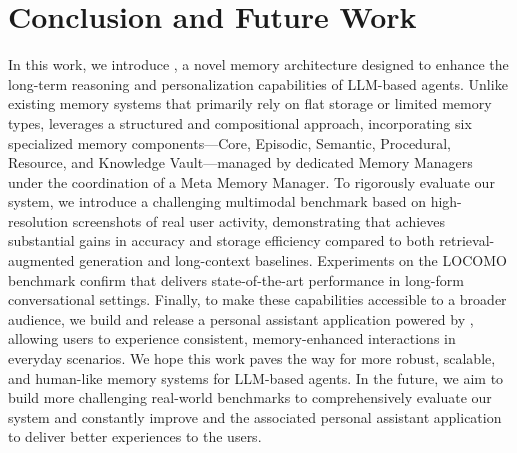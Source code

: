 \section{Conclusion and Future Work}
In this work, we introduce \ours, a novel memory architecture designed to enhance the long-term reasoning and personalization capabilities of LLM-based agents. Unlike existing memory systems that primarily rely on flat storage or limited memory types, \ours leverages a structured and compositional approach, incorporating six specialized memory components—Core, Episodic, Semantic, Procedural, Resource, and Knowledge Vault—managed by dedicated Memory Managers under the coordination of a Meta Memory Manager. To rigorously evaluate our system, we introduce a challenging multimodal benchmark based on high-resolution screenshots of real user activity, demonstrating that \ours achieves substantial gains in accuracy and storage efficiency compared to both retrieval-augmented generation and long-context baselines. Experiments on the LOCOMO benchmark confirm that \ours delivers state-of-the-art performance in long-form conversational settings. Finally, to make these capabilities accessible to a broader audience, we build and release a personal assistant application powered by \ours, allowing users to experience consistent, memory-enhanced interactions in everyday scenarios. We hope this work paves the way for more robust, scalable, and human-like memory systems for LLM-based agents. In the future, we aim to build more challenging real-world benchmarks to comprehensively evaluate our system and constantly improve \ours and the associated personal assistant application to deliver better experiences to the users.
